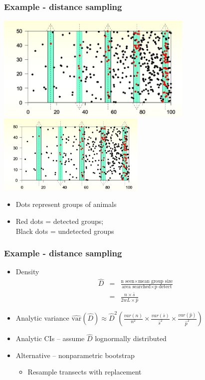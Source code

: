 \documentclass[a4paper,12pt]{article}
\newcommand{\bc}{\begin{center}}
\newcommand{\ec}{\end{center}}
\newcommand{\bi}{\begin{itemize}}
\newcommand{\ei}{\end{itemize}}
\begin{document}
\begin{frame}[fragile]
    \frametitle{Example - distance sampling}
      \bc  
          {\includegraphics[height=2in]{ds2}}
          {\includegraphics[height=1.5in]{ds2}}
      \ec
	\bi
	    \item Dots represent groups of animals
	    \item Red dots = detected groups; \\Black dots = undetected groups
	\ei
\end{frame}
\begin{frame}
    \frametitle{Example - distance sampling}
    \bi
        \item Density 
        \begin{eqnarray*}
        \hat{D} & =& \frac{\mbox{n seen} \times \mbox{mean group size}}
          {\mbox{area searched} \times \mbox{p detect}}\\
          & = & \frac{n \times \bar{s}}{2wL \times \hat{p}}
        \end{eqnarray*}
        \item Analytic variance $\hat{\mbox{var}}(\hat{D}) \approx \hat{D}^2
          \left( \frac{var(n)}{n^2} \times 
                 \frac{var(\bar{s})}{\bar{s}^2} \times
                 \frac{var(\hat{p})}{\hat{p}^2} \right)$
        \item Analytic CIs -- assume $\hat{D}$ lognormally distributed
        \item Alternative -- nonparametric bootstrap
        \bi
            \item Resample transects with replacement
        \ei
    \ei
\end{frame}
\end{document}
